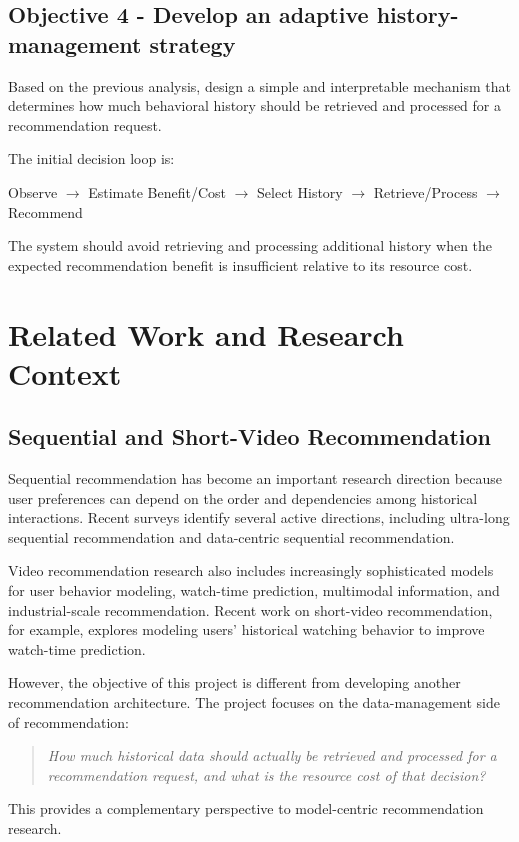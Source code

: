 \documentclass[12pt,a4paper]{article}
\begin{document}
\subsection*{Objective 4 - Develop an adaptive history-management strategy}
Based on the previous analysis, design a simple and interpretable mechanism that determines how much behavioral history should be retrieved and processed for a recommendation request.

The initial decision loop is:
\begin{center}
Observe $\rightarrow$ Estimate Benefit/Cost $\rightarrow$ Select History $\rightarrow$ Retrieve/Process $\rightarrow$ Recommend
\end{center}

The system should avoid retrieving and processing additional history when the expected recommendation benefit is insufficient relative to its resource cost.

\section{Related Work and Research Context}

\subsection{Sequential and Short-Video Recommendation}
Sequential recommendation has become an important research direction because user preferences can depend on the order and dependencies among historical interactions. Recent surveys identify several active directions, including ultra-long sequential recommendation and data-centric sequential recommendation.

Video recommendation research also includes increasingly sophisticated models for user behavior modeling, watch-time prediction, multimodal information, and industrial-scale recommendation. Recent work on short-video recommendation, for example, explores modeling users' historical watching behavior to improve watch-time prediction.

However, the objective of this project is different from developing another recommendation architecture. The project focuses on the data-management side of recommendation:
\begin{quote}
\textit{How much historical data should actually be retrieved and processed for a recommendation request, and what is the resource cost of that decision?}
\end{quote}
This provides a complementary perspective to model-centric recommendation research.
\end{document}
